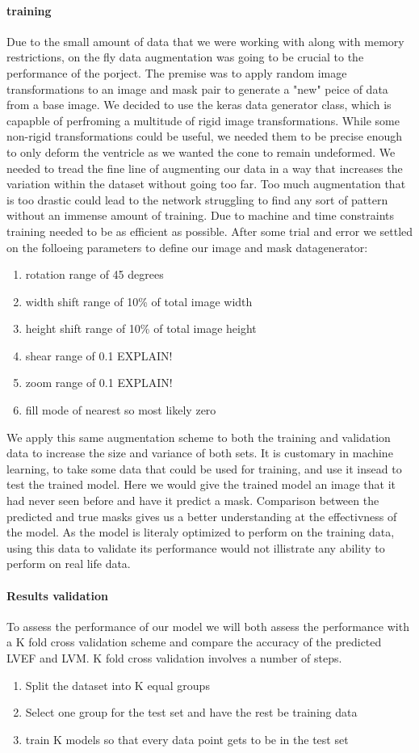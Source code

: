 \documentclass{article}
\begin{document}
{\paragraph{training}
Due to the small amount of data that we were working with along with memory restrictions, on the fly data augmentation was going to be crucial to the performance of the porject.
The premise was to apply random image transformations to an image and mask pair to generate a "new" peice of data from a base image.
We decided to use the keras data generator class, which is capapble of perfroming a multitude of rigid image transformations. 
While some non-rigid transformations could be useful, we needed them to be precise enough to only deform the ventricle as we wanted the cone to remain undeformed.
We needed to tread the fine line of augmenting our data in a way that increases the variation within the dataset without going too far.
Too much augmentation that is too drastic could lead to the network struggling to find any sort of pattern without an immense amount of training.
Due to machine and time constraints training needed to be as efficient as possible.
After some trial and error we settled on the folloeing parameters to define our image and mask datagenerator:
\begin{enumerate}
	\item{rotation range of 45 degrees}
	\item{width shift range of 10\% of total image width}
	\item{height shift range of 10\% of total image height}
	\item{shear range of 0.1 EXPLAIN!}
	\item{zoom range of 0.1 EXPLAIN!}
	\item{fill mode of nearest so most likely zero}
\end{enumerate}
We apply this same augmentation scheme to both the training and validation data to increase the size and variance of both sets.
It is customary in machine learning, to take some data that could be used for training, and use it insead to test the trained model.
Here we would give the trained model an image that it had never seen before and have it predict a mask.
Comparison between the predicted and true masks gives us a better understanding at the effectivness of the model.
As the model is literaly optimized to perform on the training data, using this data to validate its performance would not illistrate any ability to perform on real life data.
\paragraph{Results validation}
To assess the performance of our model we will both assess the performance with a K fold cross validation scheme and compare the accuracy of the predicted LVEF and LVM.
K fold cross validation involves a number of steps.
\begin{enumerate}
	\item{Split the dataset into K equal groups}
	\item{Select one group for the test set and have the rest be training data}
	\item{train K models so that every data point gets to be in the test set}
\end{enumerate}
}
\end{document}
